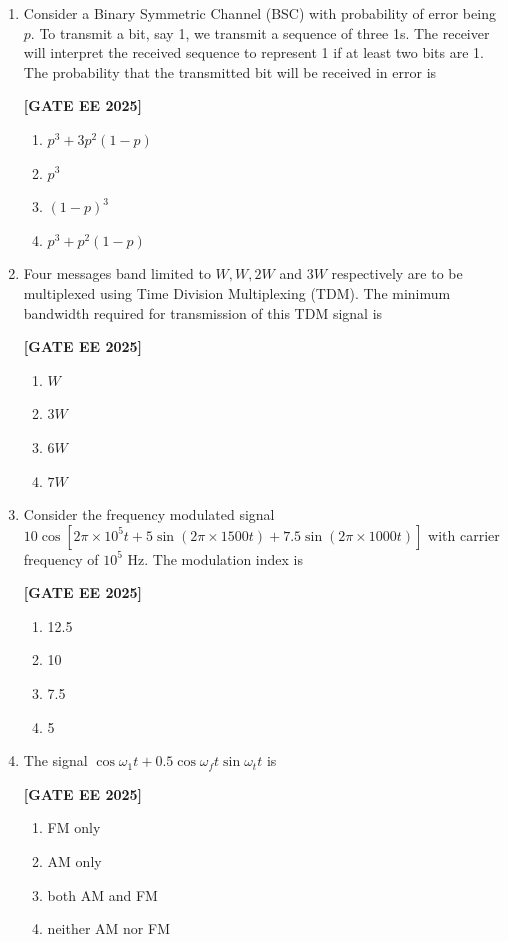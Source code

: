 \documentclass[12pt]{article}
\begin{document}
\begin{enumerate}[leftmargin=*, label=\textbf{Q.\arabic*:}]
\item Consider a Binary Symmetric Channel (BSC) with probability of error being $p$. To transmit a bit, say 1, we transmit a sequence of three 1s. The receiver will interpret the received sequence to represent 1 if at least two bits are 1. The probability that the transmitted bit will be received in error is
 
\noindent \textbf{[GATE EE 2025]}
\begin{enumerate}[label=(\Alph*)]
  \item $p^3 + 3p^2(1-p)$
  \item $p^3$
  \item $(1-p)^3$
  \item $p^3 + p^2(1-p)$
\end{enumerate}

\item Four messages band limited to $W, W, 2W$ and $3W$ respectively are to be multiplexed using Time Division Multiplexing (TDM). The minimum bandwidth required for transmission of this TDM signal is
 
\noindent \textbf{[GATE EE 2025]}
\begin{enumerate}[label=(\Alph*)]
  \item $W$
  \item $3W$
  \item $6W$
  \item $7W$
\end{enumerate}

\item Consider the frequency modulated signal $10\cos[2\pi \times 10^5 t + 5\sin(2\pi \times 1500 t) + 7.5\sin(2\pi \times 1000 t)]$ with carrier frequency of $10^5$ Hz. The modulation index is
 
\noindent \textbf{[GATE EE 2025]}
\begin{enumerate}[label=(\Alph*)]
  \item 12.5
  \item 10
  \item 7.5
  \item 5
\end{enumerate}

\item The signal $\cos \omega_1 t + 0.5 \cos \omega_f t \sin \omega_t t$ is
 
\noindent \textbf{[GATE EE 2025]}
\begin{enumerate}[label=(\Alph*)]
  \item FM only
  \item AM only
  \item both AM and FM
  \item neither AM nor FM
\end{enumerate}

\end{enumerate}
\end{document}
